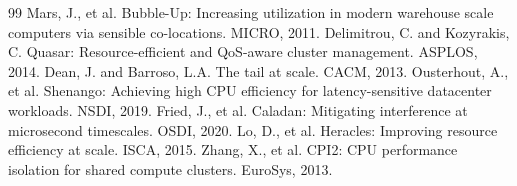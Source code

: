 \documentclass[11pt,twocolumn]{article}
\begin{document}

\begin{thebibliography}{99}
 Mars, J., et al. Bubble-Up: Increasing utilization in modern warehouse scale computers via sensible co-locations. MICRO, 2011.
 Delimitrou, C. and Kozyrakis, C. Quasar: Resource-efficient and QoS-aware cluster management. ASPLOS, 2014.
 Dean, J. and Barroso, L.A. The tail at scale. CACM, 2013.
 Ousterhout, A., et al. Shenango: Achieving high CPU efficiency for latency-sensitive datacenter workloads. NSDI, 2019.
 Fried, J., et al. Caladan: Mitigating interference at microsecond timescales. OSDI, 2020.
 Lo, D., et al. Heracles: Improving resource efficiency at scale. ISCA, 2015.
 Zhang, X., et al. CPI2: CPU performance isolation for shared compute clusters. EuroSys, 2013.
\end{thebibliography}
\end{document}
